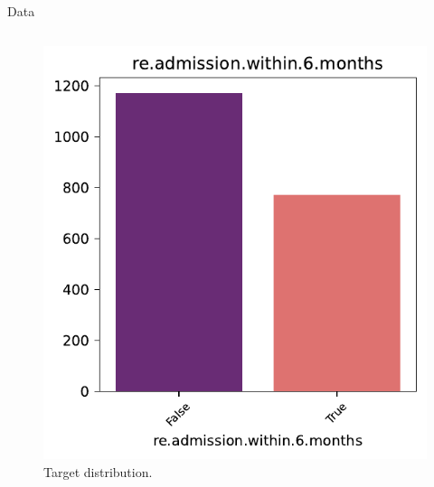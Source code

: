 \documentclass[aspectratio=169,xcolor=dvipsnames,handout]{beamer}
\begin{document}
\begin{frame}{Data}
\begin{columns}[t]
        \pause
        \begin{figure}[htpb]
            \centering
            \includegraphics[width=\textwidth]{plot_target.pdf}
            \captionsetup{font=tiny} %
            \caption{Target distribution.}
        \end{figure}
        

    \end{columns}
\end{frame}

\end{document}
